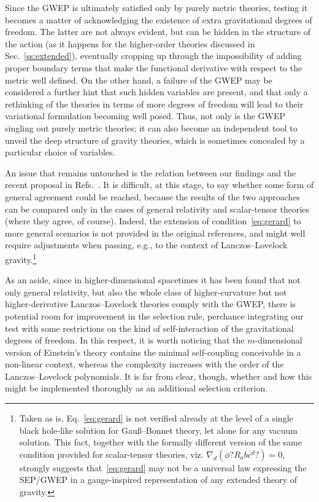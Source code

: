 \documentclass[a4paper,showkeys,aps,prd,reprint,nofootinbib,showpacs,twocolumn]{revtex4-1}
\newcommand{\eq}[1]{\( #1 \)}
\theoremstyle{plain}
\begin{document}
Since the GWEP is ultimately satisfied only by purely metric theories, testing it becomes a matter of acknowledging the existence of extra gravitational degrees of freedom.  The latter are not always evident, but can be  hidden in the structure of the action (as it happens for the higher-order theories discussed in Sec.~\ref{ss:extended}), eventually cropping up through the impossibility of adding proper boundary terms that make the functional derivative with respect to the metric well defined.  On the other hand, a failure of the GWEP may be considered a further hint that such hidden variables are present, and that only a rethinking of the theories in terms of more degrees of freedom will lead to their variational formulation becoming well posed.  Thus, not only is the GWEP singling out purely metric theories; it can also become an independent tool to unveil the deep structure of gravity theories, which is sometimes concealed by a particular choice of variables.

An issue that remains untouched is the relation between our findings and the recent proposal in Refs.~\cite{Gerard:2006ia,Gerard:2008nc}.  It is difficult, at this stage, to say whether some form of general agreement could be reached, because the results of the two approaches can be compared only in the cases of general relativity and scalar-tensor theories (where they agree, of course).  Indeed, the  extension of condition~\eqref{eq:gerard} to more general scenarios is not provided in the original references, and might well require adjustments when passing, e.g., to the context of Lanczos--Lovelock gravity.\footnote{Taken as is, Eq.~\eqref{eq:gerard} is not verified already at the level of a single black hole-like solution for Gau\ss{}--Bonnet theory, let alone for any vacuum solution. This fact, together with the formally different version of the same condition provided for scalar-tensor theories, viz. \eq{\nabla_{\! d} (\phi ?R_abc^d?) = 0}, strongly suggests that~\eqref{eq:gerard} may not be a universal law expressing the SEP/GWEP in a gauge-inspired representation of any extended theory of gravity.}

As an aside, since in higher-dimensional spacetimes it has been found that not only general relativity, but also the whole class of higher-curvature but not higher-derivative Lanczos--Lovelock theories comply with the GWEP, there is potential room for improvement in the selection rule, perchance integrating our test with some restrictions on the kind of self-interaction of the gravitational degrees of freedom. In this respect, it is worth noticing that the \eq{m}-dimensional version of Einstein's theory contains the minimal self-coupling conceivable in a non-linear context, whereas the complexity increases with the order of the Lanczos--Lovelock polynomials. It is far from clear, though, whether and how this might be implemented thoroughly as an additional selection criterion.
\end{document}
